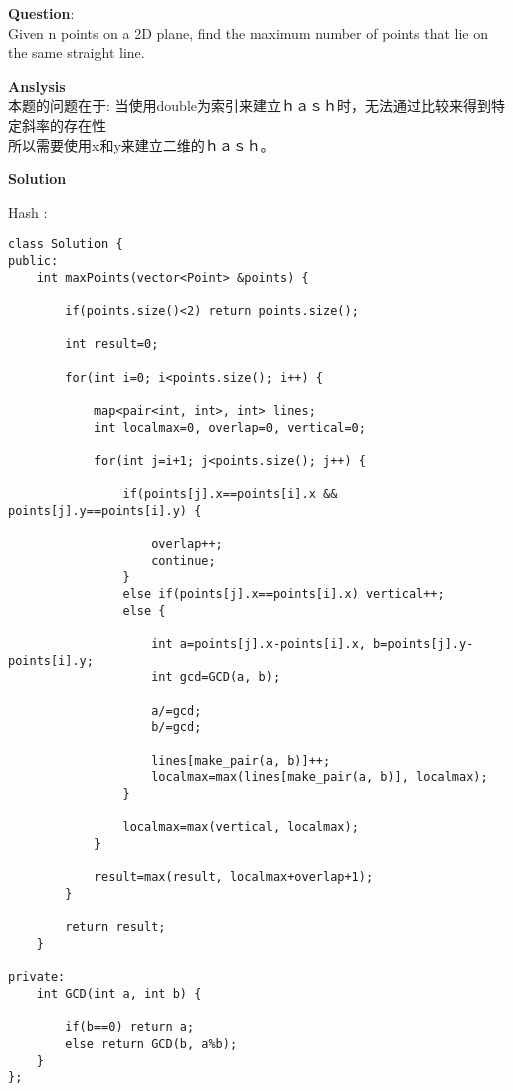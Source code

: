     
\begin{description}
    \item{\textbf{Question}}:\\%
		Given n points on a 2D plane, find the maximum number of points that lie on the same straight line.\\

    \item{\textbf{Anslysis}}\\
		本题的问题在于: 当使用double为索引来建立ｈａｓｈ时，无法通过比较来得到特定斜率的存在性\\
		所以需要使用x和y来建立二维的ｈａｓｈ。\\

    \item{\textbf{Solution}}\\
	\item{Hash} : \\
		\begin{lstlisting}
class Solution {
public:
    int maxPoints(vector<Point> &points) {

        if(points.size()<2) return points.size();

        int result=0;

        for(int i=0; i<points.size(); i++) {

            map<pair<int, int>, int> lines;
            int localmax=0, overlap=0, vertical=0;

            for(int j=i+1; j<points.size(); j++) {

                if(points[j].x==points[i].x && points[j].y==points[i].y) {

                    overlap++;
                    continue;
                }
                else if(points[j].x==points[i].x) vertical++;
                else {

                    int a=points[j].x-points[i].x, b=points[j].y-points[i].y;
                    int gcd=GCD(a, b);

                    a/=gcd;
                    b/=gcd;

                    lines[make_pair(a, b)]++;
                    localmax=max(lines[make_pair(a, b)], localmax);
                }

                localmax=max(vertical, localmax);
            }

            result=max(result, localmax+overlap+1);
        }

        return result;
    }

private:
    int GCD(int a, int b) {

        if(b==0) return a;
        else return GCD(b, a%b);
    }
};
		\end{lstlisting}

\end{description}

